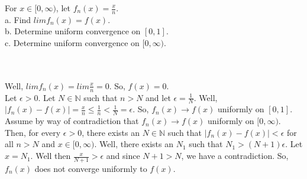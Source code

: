 For $x\in[0,\infty)$, let $f_n(x)=\frac{x}{n}$.\\

a. Find $limf_n(x)=f(x)$.\\

b. Determine uniform convergence on $[0,1]$.\\

c. Determine uniform convergence on $[0,\infty)$.\\\\

\begin{solution}\renewcommand{\qedsymbol}{}\ \\
    Well, $limf_n(x)=lim\frac{x}{n}=0$. So, $f(x)=0$.\\

    Let $\epsilon>0$. Let $N\in\mathbb{N}$ such that $n>N$ and let $\epsilon=\frac1N$. Well,
    $|f_n(x)-f(x)|=\frac{x}{n}\leq\frac1n<\frac1N=\epsilon$. So, $f_n(x)\rightarrow f(x)$ uniformly on
    $[0,1]$.\\

    Assume by way of contradiction that $f_n(x)\rightarrow f(x)$ uniformly on $[0,\infty)$. Then, for
    every $\epsilon>0$, there exists an $N\in\mathbb{N}$ such that $|f_n(x)-f(x)|<\epsilon$ for all
    $n>N$ and $x\in[0,\infty)$. Well, there exists an $N_1$ such that $N_1>(N+1)\epsilon$. Let $x=N_1$.
    Well then $\frac{x}{N+1}>\epsilon$ and since $N+1>N$, we have a contradiction. So, $f_n(x)$ does not
    converge uniformly to $f(x)$.

\end{solution}